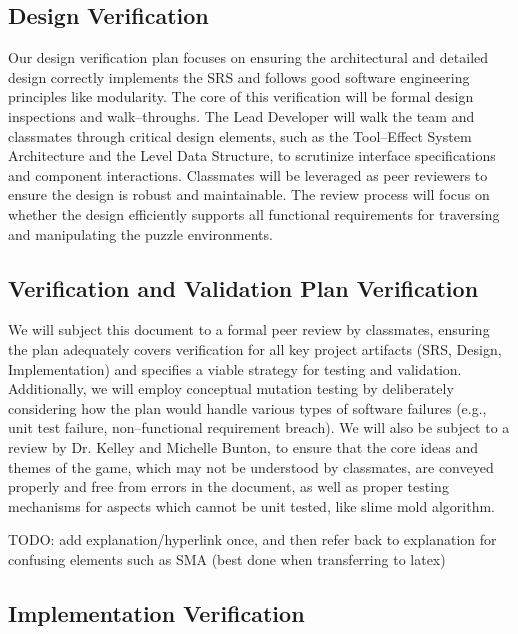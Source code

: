 \documentclass[12pt, titlepage]{article}
\begin{document}
\subsection{Design Verification}

Our design verification plan focuses on ensuring the architectural and detailed design correctly implements the SRS and follows good software engineering principles like modularity. The core of this verification will be formal design inspections and walk--throughs. The Lead Developer will walk the team and classmates through critical design elements, such as the Tool--Effect System Architecture and the Level Data Structure, to scrutinize interface specifications and component interactions. Classmates will be leveraged as peer reviewers to ensure the design is robust and maintainable. The review process will focus on whether the design efficiently supports all functional requirements for traversing and manipulating the puzzle environments.

\subsection{Verification and Validation Plan Verification}

We will subject this document to a formal peer review by classmates, ensuring the plan adequately covers verification for all key project artifacts (SRS, Design, Implementation) and specifies a viable strategy for testing and validation. Additionally, we will employ conceptual mutation testing by deliberately considering how the plan would handle various types of software failures (e.g., unit test failure, non--functional requirement breach). We will also be subject to a review by Dr. Kelley and Michelle Bunton, to ensure that the core ideas and themes of the game, which may not be understood by classmates, are conveyed properly and free from errors in the document, as well as proper testing mechanisms for aspects which cannot be unit tested, like slime mold algorithm.

TODO: add explanation/hyperlink once, and then refer back to explanation for confusing elements such as SMA (best done when transferring to latex)

\subsection{Implementation Verification}
\end{document}
